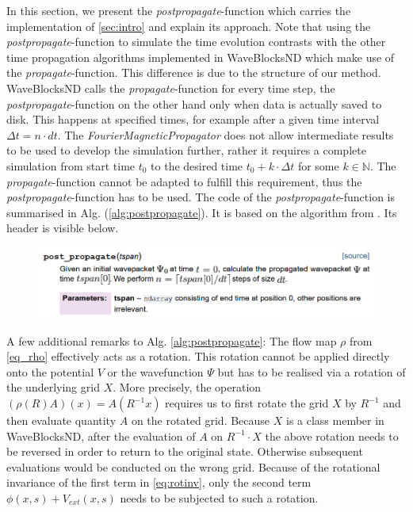 \documentclass[11pt, a4paper, oneside]{article}
\begin{document}
In this section, we present the \emph{postpropagate}-function which carries the implementation of \cref{sec:intro} and explain its approach. \newline
Note that using the \emph{postpropagate}-function to simulate the time evolution contrasts with the other time propagation algorithms implemented in WaveBlocksND which make use of the \emph{propagate}-function. This difference is due to the structure of our method. WaveBlocksND calls the \emph{propagate}-function for every time step, the \emph{postpropagate}-function on the other hand only when data is actually saved to disk. This happens at specified times, for example after a given time interval $\Delta t = n\cdot dt$. The \emph{FourierMagneticPropagator} does not allow intermediate results to be used to develop the simulation further, rather it requires a complete simulation from start time $t_0$ to the desired time $t_0 + k\cdot \Delta t$ for some $k\in \mathbb{N}$.
The \emph{propagate}-function cannot be adapted to fulfill this requirement, thus the \emph{postpropagate}-function has to be used.\newline
The code of the \emph{postpropagate}-function is summarised in Alg. (\ref{alg:postpropagate}). It is based on the algorithm from . Its header is visible below.
\begin{figure}[ht]
  \centering
  \includegraphics[width = 0.9 \textwidth]{graphics/doc_postpropagate.PNG}
\end{figure}

A few additional remarks to Alg. \ref{alg:postpropagate}: The flow map $\rho$ from \cref{eq_rho} effectively acts as a rotation. This rotation cannot be applied directly onto the potential $V$ or the wavefunction $\Psi$ but has to be realised via a rotation of the underlying grid $X$. More precisely, the operation $(\rho(R)A)(x) = A(R^{-1}x)$ requires us to first rotate the grid $X$ by $R^{-1}$ and then evaluate quantity $A$ on the rotated grid. Because $X$ is a class member in WaveBlocksND, after the evaluation of $A$ on $R^{-1}\cdot X$ the above rotation needs to be reversed in order to return to the original state. Otherwise subsequent evaluations would be conducted on the wrong grid.\newline
Because of the rotational invariance of the first term in \cref{eq:rotinv}, only the second term $\phi(x,s) + V_{ext}(x,s)$ needs to be subjected to such a rotation. \newline
\end{document}
